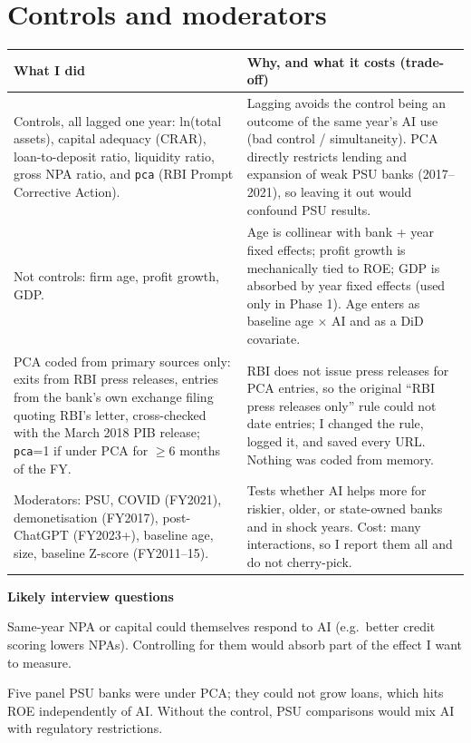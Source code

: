 \documentclass[10.5pt,a4paper]{article}
\newcommand{\var}[1]{\texttt{#1}}
\newenvironment{decisions}{%
  \begin{longtable}{L{0.36\textwidth} L{0.58\textwidth}}
  \toprule
  \textcolor{head}{\textbf{What I did}} & \textcolor{head}{\textbf{Why, and what it costs (trade-off)}}\\
  \midrule\endhead}{%
  \end{longtable}}
\newcommand{\row}[2]{#1 & #2\\ \midrule}
\newenvironment{qa}{\par\noindent\textcolor{qcol}{\textbf{Likely interview questions}}\begin{description}[font=\normalfont\itshape,leftmargin=0pt,style=nextline]}{\end{description}}
\newcommand{\q}[2]{\item[``#1'']#2}
\begin{document}
\section{Controls and moderators}
\begin{decisions}
\row{Controls, all lagged one year: ln(total assets), capital adequacy (CRAR), loan-to-deposit ratio, liquidity
ratio, gross NPA ratio, and \var{pca} (RBI Prompt Corrective Action).}
{Lagging avoids the control being an outcome of the same year's AI use (bad control / simultaneity). PCA directly
restricts lending and expansion of weak PSU banks (2017--2021), so leaving it out would confound PSU results.}
\row{Not controls: firm age, profit growth, GDP.}
{Age is collinear with bank + year fixed effects; profit growth is mechanically tied to ROE; GDP is absorbed by year
fixed effects (used only in Phase 1). Age enters as baseline age $\times$ AI and as a DiD covariate.}
\row{PCA coded from primary sources only: exits from RBI press releases, entries from the bank's own exchange filing
quoting RBI's letter, cross-checked with the March 2018 PIB release; \var{pca}=1 if under PCA for $\ge$6 months of the
FY.}
{RBI does not issue press releases for PCA entries, so the original ``RBI press releases only'' rule could not date
entries; I changed the rule, logged it, and saved every URL. Nothing was coded from memory.}
\row{Moderators: PSU, COVID (FY2021), demonetisation (FY2017), post-ChatGPT (FY2023+), baseline age, size, baseline
Z-score (FY2011--15).}
{Tests whether AI helps more for riskier, older, or state-owned banks and in shock years. Cost: many interactions, so I
report them all and do not cherry-pick.}
\end{decisions}
\begin{qa}
\q{Why lag the controls?}{Same-year NPA or capital could themselves respond to AI (e.g.\ better credit scoring lowers
NPAs). Controlling for them would absorb part of the effect I want to measure.}
\q{Why is PCA important for this question?}{Five panel PSU banks were under PCA; they could not grow loans, which hits
ROE independently of AI. Without the control, PSU comparisons would mix AI with regulatory restrictions.}
\end{qa}
\end{document}
